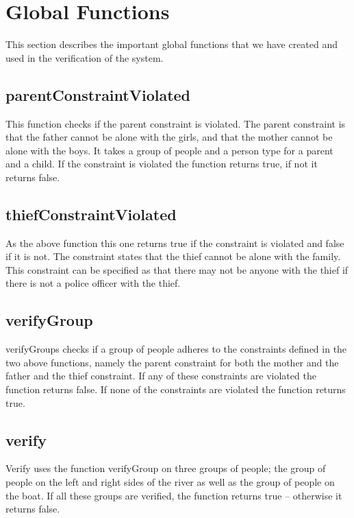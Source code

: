 \section{Global Functions}
\label{globalfunctions}
This section describes the important global functions that we have created and used in the verification of the system.

\subsection{parentConstraintViolated}
This function checks if the parent constraint is violated. 
The parent constraint is that the father cannot be alone with the girls, and that the mother cannot be alone with the boys.
It takes a group of people and a person type for a parent and a child.
If the constraint is violated the function returns true, if not it returns false.

\subsection{thiefConstraintViolated}
As the above function this one returns true if the constraint is violated and false if it is not.
The constraint states that the thief cannot be alone with the family.
This constraint can be specified as that there may not be anyone with the thief if there is not a police officer with the thief.

\subsection{verifyGroup}
verifyGroups checks if a group of people adheres to the constraints defined in the two above functions, namely the parent constraint for both the mother and the father and the thief constraint.
If any of these constraints are violated the function returns false.
If none of the constraints are violated the function returns true.

\subsection{verify}
\label{global:verify}
Verify uses the function verifyGroup on three groups of people; the group of people on the left and right sides of the river as well as the group of people on the boat.
If all these groups are verified, the function returns true -- otherwise it returns false.